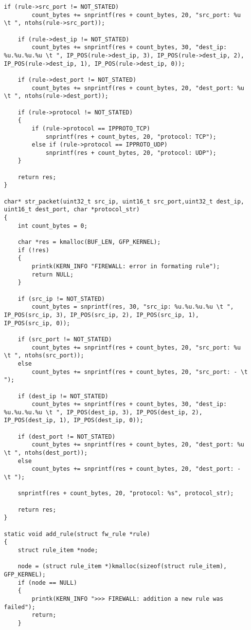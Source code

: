 \begin{lstlisting}[caption = {fw\_module.c}]
	if (rule->src_port != NOT_STATED)
		count_bytes += snprintf(res + count_bytes, 20, "src_port: %u \t ", ntohs(rule->src_port));
	
	if (rule->dest_ip != NOT_STATED)
		count_bytes += snprintf(res + count_bytes, 30, "dest_ip: %u.%u.%u.%u \t ", IP_POS(rule->dest_ip, 3), IP_POS(rule->dest_ip, 2), IP_POS(rule->dest_ip, 1), IP_POS(rule->dest_ip, 0));
	
	if (rule->dest_port != NOT_STATED)
		count_bytes += snprintf(res + count_bytes, 20, "dest_port: %u \t ", ntohs(rule->dest_port));
	
	if (rule->protocol != NOT_STATED)
	{
		if (rule->protocol == IPPROTO_TCP)
			snprintf(res + count_bytes, 20, "protocol: TCP");
		else if (rule->protocol == IPPROTO_UDP)
			snprintf(res + count_bytes, 20, "protocol: UDP");
	}
	
	return res;
}

char* str_packet(uint32_t src_ip, uint16_t src_port,uint32_t dest_ip, uint16_t dest_port, char *protocol_str)
{
	int count_bytes = 0;
	
	char *res = kmalloc(BUF_LEN, GFP_KERNEL);
	if (!res)
	{
		printk(KERN_INFO "FIREWALL: error in formating rule");
		return NULL;
	}
	
	if (src_ip != NOT_STATED)
		count_bytes = snprintf(res, 30, "src_ip: %u.%u.%u.%u \t ", IP_POS(src_ip, 3), IP_POS(src_ip, 2), IP_POS(src_ip, 1), IP_POS(src_ip, 0));
	
	if (src_port != NOT_STATED)
		count_bytes += snprintf(res + count_bytes, 20, "src_port: %u \t ", ntohs(src_port));
	else
		count_bytes += snprintf(res + count_bytes, 20, "src_port: - \t ");
	
	if (dest_ip != NOT_STATED)
		count_bytes += snprintf(res + count_bytes, 30, "dest_ip: %u.%u.%u.%u \t ", IP_POS(dest_ip, 3), IP_POS(dest_ip, 2), IP_POS(dest_ip, 1), IP_POS(dest_ip, 0));
	
	if (dest_port != NOT_STATED)
		count_bytes += snprintf(res + count_bytes, 20, "dest_port: %u \t ", ntohs(dest_port));
	else
		count_bytes += snprintf(res + count_bytes, 20, "dest_port: - \t ");
	
	snprintf(res + count_bytes, 20, "protocol: %s", protocol_str);
	
	return res;
}

static void add_rule(struct fw_rule *rule)
{
	struct rule_item *node;
	
	node = (struct rule_item *)kmalloc(sizeof(struct rule_item), GFP_KERNEL);
	if (node == NULL)
	{
		printk(KERN_INFO ">>> FIREWALL: addition a new rule was failed");
		return;
	}
	

\end{lstlisting}
